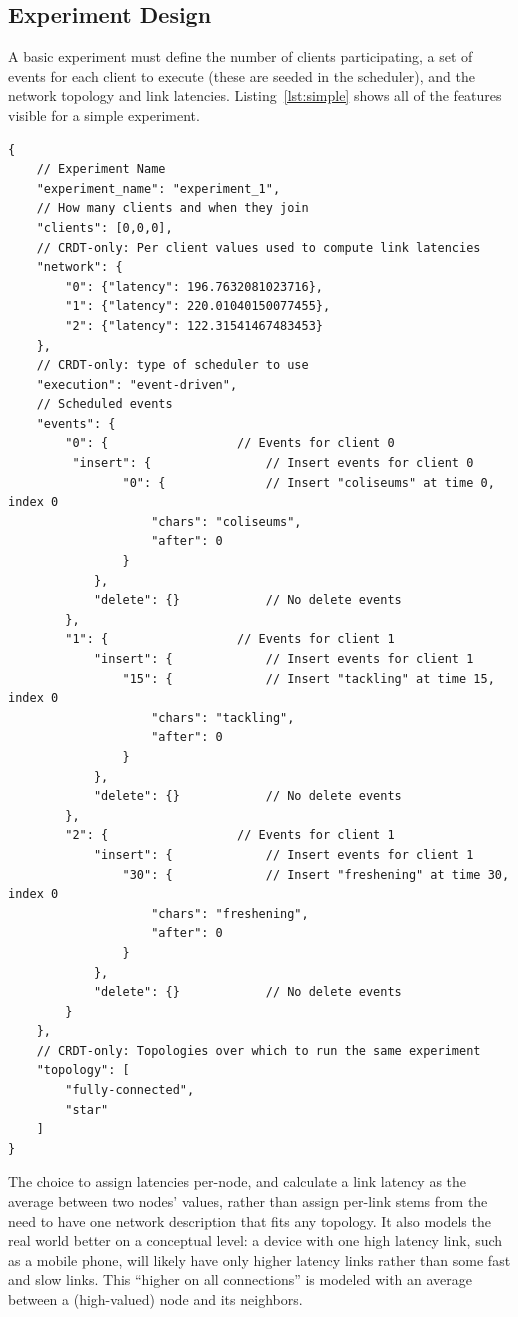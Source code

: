 \documentclass[12pt,a4paper,twoside,openright]{report}
\begin{document}
	\subsection{Experiment Design}
	
	A basic experiment must define the number of clients participating, a set of events for each client to execute (these are seeded in the scheduler), and the network topology and link latencies. Listing~\ref{lst:simple} shows all of the features visible for a simple experiment.
	

\begin{lstlisting}[caption={A simple JSON experiment setup. Comments added for explanation and not part of JSON syntax}, label={lst:simple}]
{
	// Experiment Name
    "experiment_name": "experiment_1", 	
	// How many clients and when they join
    "clients": [0,0,0],		
	// CRDT-only: Per client values used to compute link latencies	
    "network": {				
        "0": {"latency": 196.7632081023716}, 
        "1": {"latency": 220.01040150077455}, 
        "2": {"latency": 122.31541467483453}
    },
	// CRDT-only: type of scheduler to use
    "execution": "event-driven", 	
	// Scheduled events
    "events": {						
        "0": {					// Events for client 0
         "insert": {				// Insert events for client 0
                "0": {				// Insert "coliseums" at time 0, index 0
                    "chars": "coliseums", 
                    "after": 0
                }
            }, 
            "delete": {}			// No delete events
        }, 
        "1": {					// Events for client 1
            "insert": {				// Insert events for client 1
                "15": {				// Insert "tackling" at time 15, index 0
                    "chars": "tackling", 		
                    "after": 0
                }
            }, 
            "delete": {}			// No delete events
        }, 
        "2": {					// Events for client 1
            "insert": {				// Insert events for client 1
                "30": {				// Insert "freshening" at time 30, index 0
                    "chars": "freshening", 
                    "after": 0
                }
            }, 
            "delete": {}			// No delete events
        }
	},
	// CRDT-only: Topologies over which to run the same experiment
    "topology": [					
        "fully-connected", 
        "star"
    ]
}
\end{lstlisting}

	The choice to assign latencies per-node, and calculate a link latency as the average between two nodes' values, rather than assign per-link stems from the need to have one network description that fits any topology. It also models the real world better on a conceptual level: a device with one high latency link, such as a mobile phone, will likely have only higher latency links rather than some fast and slow links. This ``higher on all connections'' is modeled with an average between a (high-valued) node and its neighbors.
\end{document}
